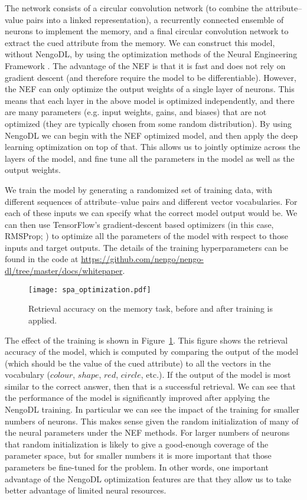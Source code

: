 \documentclass{article}
\begin{document}
The network consists of a circular convolution network (to combine the attribute--value pairs into a linked representation), a recurrently connected ensemble of neurons to implement the memory, and a final circular convolution network to extract the cued attribute from the memory.  We can construct this model, without NengoDL, by using the optimization methods of the Neural Engineering Framework \citep[NEF;][]{Eliasmith2005}.  The advantage of the NEF is that it is fast and does not rely on gradient descent (and therefore require the model to be differentiable).  However, the NEF can only optimize the output weights of a single layer of neurons.  This means that each layer in the above model is optimized independently, and there are many parameters (e.g. input weights, gains, and biases) that are not optimized (they are typically chosen from some random distribution).  By using NengoDL we can begin with the NEF optimized model, and then apply the deep learning optimization on top of that.  This allows us to jointly optimize across the layers of the model, and fine tune all the parameters in the model as well as the output weights.

We train the model by generating a randomized set of training data, with different sequences of attribute--value pairs and different vector vocabularies.  For each of these inputs we can specify what the correct model output would be.  We can then use TensorFlow's gradient-descent based optimizers (in this case, RMSProp; \citealt{Tieleman2012}) to optimize all the parameters of the model with respect to those inputs and target outputs.  The details of the training hyperparameters can be found in the code at \url{https://github.com/nengo/nengo-dl/tree/master/docs/whitepaper}.

\begin{figure}
\centering
\texttt{[image: spa\_optimization.pdf]}
\caption{Retrieval accuracy on the memory task, before and after training is applied.}
\label{fig:spa_optimization}
\end{figure}

The effect of the training is shown in Figure~\ref{fig:spa_optimization}.  This figure shows the retrieval accuracy of the model, which is computed by comparing the output of the model (which should be the value of the cued attribute) to all the vectors in the vocabulary ($colour$, $shape$, $red$, $circle$, etc.).  If the output of the model is most similar to the correct answer, then that is a successful retrieval.  We can see that the performance of the model is significantly improved after applying the NengoDL training.  In particular we can see the impact of the training for smaller numbers of neurons.  This makes sense given the random initialization of many of the neural parameters under the NEF methods. For larger numbers of neurons that random initialization is likely to give a good-enough coverage of the parameter space, but for smaller numbers it is more important that those parameters be fine-tuned for the problem.  In other words, one important advantage of the NengoDL optimization features are that they allow us to take better advantage of limited neural resources.
\end{document}
